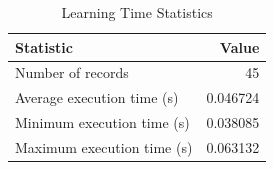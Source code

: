 
\begin{table}[h!]
\centering
\begin{tabular}{l r}
\hline
Statistic & Value \\
\hline
Number of records & 45 \\
Average execution time (s) & 0.046724 \\
Minimum execution time (s) & 0.038085 \\
Maximum execution time (s) & 0.063132 \\
\hline
\end{tabular}
\caption{Learning Time Statistics}
\end{table}
